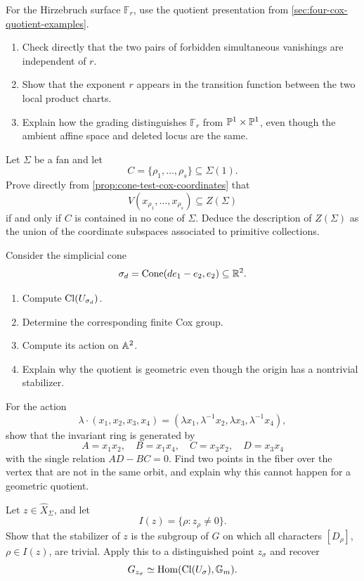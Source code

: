 \begin{exercises}
\item For the Hirzebruch surface \(\mathbb F_r\), use the quotient
presentation from \cref{sec:four-cox-quotient-examples}.
\begin{enumerate}[label=(\alph*),wide=0pt]
\item Check directly that the two pairs of forbidden simultaneous
vanishings are independent of \(r\).
\item Show that the exponent \(r\) appears in the transition function
between the two local product charts.
\item Explain how the grading distinguishes \(\mathbb F_r\) from
\(\mathbb{P}^1\times\mathbb{P}^1\), even though the ambient affine space and deleted
locus are the same.
\end{enumerate}

\item Let \(\Sigma\) be a fan and let
\[
C=\{\rho_1,\ldots,\rho_s\}\subseteq\Sigma(1).
\]
Prove directly from \cref{prop:cone-test-cox-coordinates} that
\[
V(x_{\rho_1},\ldots,x_{\rho_s})\subseteq Z(\Sigma)
\]
if and only if \(C\) is contained in no cone of \(\Sigma\). Deduce the
description of \(Z(\Sigma)\) as the union of the coordinate subspaces
associated to primitive collections.

\item Consider the simplicial cone
\[
\sigma_d=\operatorname{Cone}(de_1-e_2,e_2)\subseteq\mathbb{R}^2.
\]
\begin{enumerate}[label=(\alph*),wide=0pt]
\item Compute \(\operatorname{Cl}(U_{\sigma_d})\).
\item Determine the corresponding finite Cox group.
\item Compute its action on \(\mathbb{A}^2\).
\item Explain why the quotient is geometric even though the origin
has a nontrivial stabilizer.
\end{enumerate}

\item For the action
\[
\lambda\cdot(x_1,x_2,x_3,x_4)
=
(\lambda x_1,\lambda^{-1}x_2,
 \lambda x_3,\lambda^{-1}x_4),
\]
show that the invariant ring is generated by
\[
A=x_1x_2,
\quad
B=x_1x_4,
\quad
C=x_3x_2,
\quad
D=x_3x_4
\]
with the single relation \(AD-BC=0\). Find two points in the fiber
over the vertex that are not in the same orbit, and explain why this
cannot happen for a geometric quotient.

\item Let \(z\in\widehat X_\Sigma\), and let
\[
I(z)=\{\rho:z_\rho\neq0\}.
\]
Show that the stabilizer of \(z\) is the subgroup of \(G\) on which
all characters \([D_\rho]\), \(\rho\in I(z)\), are trivial. Apply this
to a distinguished point \(z_\sigma\) and recover
\[
G_{z_\sigma}
\simeq
\operatorname{Hom}(\operatorname{Cl}(U_\sigma),\mathbb{G}_{m}).
\]


\end{exercises}
